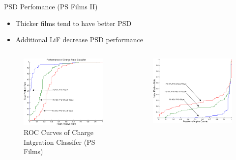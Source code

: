 \begin{frame}{PSD Perfomance (PS Films II)}
\small
\begin{itemize}
	\item Thicker films tend to have better PSD
	\item Additional LiF decrease PSD performance
\end{itemize}
\begin{columns}[onlytextwidth]
\begin{column}{0.45\textwidth}
	\tiny
	\begin{figure}
		\centering
		\includegraphics[width=\textwidth]{images/ROC_Comparison.eps}
		\caption{ROC Curves of Charge Intgration Classifer (PS Films)}
	\end{figure}
\end{column}
\begin{column}{0.45\textwidth}
	\tiny
	\begin{figure}
		\centering
		\includegraphics[width=\textwidth]{images/FPRvsFractionCounts_Comparison.eps}

\end{figure}
\end{column}
\end{columns}
\end{frame}
